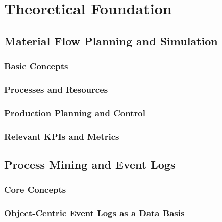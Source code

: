 \chapter{Theoretical Foundation}
\label{chap:theory}

\section{Material Flow Planning and Simulation}
\subsection{Basic Concepts}

\subsection{Processes and Resources}

\subsection{Production Planning and Control}

\subsection{Relevant KPIs and Metrics}

\section{Process Mining and Event Logs}

\subsection{Core Concepts}

\subsection{Object-Centric Event Logs as a Data Basis}



